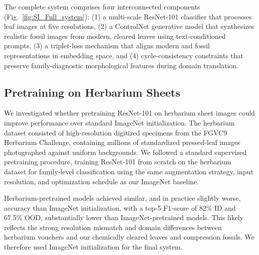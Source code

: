 \documentclass[pdflatex,lineno,sn-nature]{sn-jnl}%
\theoremstyle{plain}%
\theoremstyle{definition}%
\theoremstyle{remark}%
\begin{document}
\begin{oldappendices}
The complete system comprises four interconnected components (Fig.~\ref{fig:SI_Full_system}): 
(1) a multi-scale ResNet-101 classifier that processes leaf images at five 
resolutions, (2) a ControlNet generative model that synthesizes realistic 
fossil images from modern, cleared leaves using text-conditioned prompts, 
(3) a triplet-loss mechanism that aligns modern and fossil representations 
in embedding space, and (4) cycle-consistency constraints that preserve 
family-diagnostic morphological features during domain translation.



\subsection{Pretraining on Herbarium Sheets}

We investigated whether pretraining ResNet-101 on herbarium sheet images could improve 
performance over standard ImageNet initialization. The herbarium dataset consisted of 
high-resolution digitized specimens from the FGVC9 Herbarium Challenge, containing 
millions of standardized pressed-leaf images photographed against uniform backgrounds. We 
followed a standard supervised pretraining procedure, training ResNet-101 from scratch on the 
herbarium dataset for family-level classification using the same augmentation strategy, input 
resolution, and optimization schedule as our ImageNet baseline.

Herbarium-pretrained models achieved similar, and in practice slightly worse, accuracy than 
ImageNet initialization, with a top-5 F1-score of 82\% ID and 67.5\% 
OOD, substantially lower than ImageNet-pretrained models. This likely reflects 
the strong resolution mismatch and domain differences between herbarium vouchers and our 
chemically cleared leaves and compression fossils. We therefore used ImageNet initialization 
for the final system.



\end{oldappendices}
\end{document}
